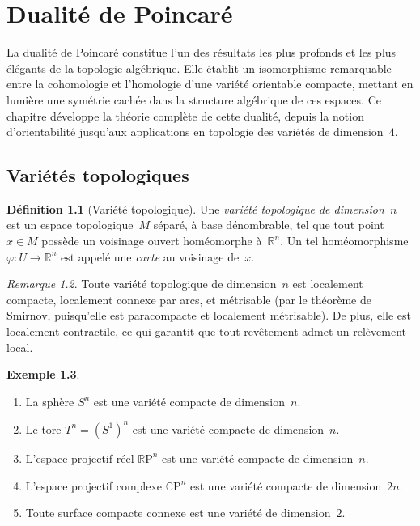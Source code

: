 \documentclass[12pt,a4paper,openany]{book}
\theoremstyle{definition}
\newtheorem{definition}{Définition}[chapter]
\newtheorem{exemple}[definition]{Exemple}
\theoremstyle{plain}
\theoremstyle{remark}
\newtheorem{remarque}[definition]{Remarque}
\newcommand{\R}{\mathbb{R}}
\newcommand{\RP}{\mathbb{R}\mathrm{P}}
\newcommand{\CP}{\mathbb{C}\mathrm{P}}
\begin{document}
\chapter{Dualité de Poincaré}\label{chap:poincare}

La dualité de Poincaré constitue l'un des résultats les plus profonds et les plus
élégants de la topologie algébrique. Elle établit un isomorphisme remarquable entre
la cohomologie et l'homologie d'une variété orientable compacte, mettant en lumière
une symétrie cachée dans la structure algébrique de ces espaces. Ce chapitre développe
la théorie complète de cette dualité, depuis la notion d'orientabilité jusqu'aux
applications en topologie des variétés de dimension~$4$.

\section{Variétés topologiques}\label{sec:varietes-topo}

\begin{definition}[Variété topologique]\label{def:variete-topo}
  Une \emph{variété topologique de dimension~$n$}
  est un espace topologique~$M$ séparé, à base dénombrable, tel que tout point
  $x \in M$ possède un voisinage ouvert homéomorphe à~$\R^n$. Un tel homéomorphisme
  $\varphi \colon U \to \R^n$ est appelé une \emph{carte} au
  voisinage de~$x$.
\end{definition}

\begin{remarque}\label{rem:variete-localement-compacte}
  Toute variété topologique de dimension~$n$ est localement compacte, localement
  connexe par arcs, et métrisable (par le théorème de Smirnov, puisqu'elle est
  paracompacte et localement métrisable). De plus, elle est localement contractile,
  ce qui garantit que tout revêtement admet un relèvement local.
\end{remarque}

\begin{exemple}\label{ex:varietes-exemples}
  \begin{enumerate}[label=(\roman*)]
    \item La sphère $S^n$ est une variété compacte de dimension~$n$.
    \item Le tore $T^n = (S^1)^n$ est une variété compacte de dimension~$n$.
    \item L'espace projectif réel $\RP^n$ est une variété
          compacte de dimension~$n$.
    \item L'espace projectif complexe $\CP^n$ est une
          variété compacte de dimension~$2n$.
    \item Toute surface compacte connexe est une variété de dimension~$2$.
  \end{enumerate}
\end{exemple}
\end{document}
